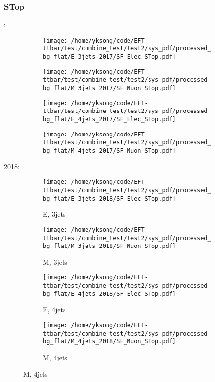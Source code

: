 \documentclass{beamer}
\begin{document}
\begin{frame}
\frametitle{STop}
\fontsize{5}{1}:
\begin{figure}
\centering
\begin{subfigure}[b]{0.24\textwidth}
\texttt{[image: /home/yksong/code/EFT-ttbar/test/combine\_test/test2/sys\_pdf/processed\_bg\_flat/E\_3jets\_2017/SF\_Elec\_STop.pdf]}
\end{subfigure}
\begin{subfigure}[b]{0.24\textwidth}
\texttt{[image: /home/yksong/code/EFT-ttbar/test/combine\_test/test2/sys\_pdf/processed\_bg\_flat/M\_3jets\_2017/SF\_Muon\_STop.pdf]}
\end{subfigure}
\begin{subfigure}[b]{0.24\textwidth}
\texttt{[image: /home/yksong/code/EFT-ttbar/test/combine\_test/test2/sys\_pdf/processed\_bg\_flat/E\_4jets\_2017/SF\_Elec\_STop.pdf]}
\end{subfigure}
\begin{subfigure}[b]{0.24\textwidth}
\texttt{[image: /home/yksong/code/EFT-ttbar/test/combine\_test/test2/sys\_pdf/processed\_bg\_flat/M\_4jets\_2017/SF\_Muon\_STop.pdf]}
\end{subfigure}
\end{figure}
2018:
\begin{figure}
\centering
\begin{subfigure}[b]{0.24\textwidth}
\texttt{[image: /home/yksong/code/EFT-ttbar/test/combine\_test/test2/sys\_pdf/processed\_bg\_flat/E\_3jets\_2018/SF\_Elec\_STop.pdf]}
\captionsetup{font=tiny}
\caption{E, 3jets}
\end{subfigure}
\begin{subfigure}[b]{0.24\textwidth}
\texttt{[image: /home/yksong/code/EFT-ttbar/test/combine\_test/test2/sys\_pdf/processed\_bg\_flat/M\_3jets\_2018/SF\_Muon\_STop.pdf]}
\captionsetup{font=tiny}
\caption{M, 3jets}
\end{subfigure}
\begin{subfigure}[b]{0.24\textwidth}
\texttt{[image: /home/yksong/code/EFT-ttbar/test/combine\_test/test2/sys\_pdf/processed\_bg\_flat/E\_4jets\_2018/SF\_Elec\_STop.pdf]}
\captionsetup{font=tiny}
\caption{E, 4jets}
\end{subfigure}
\begin{subfigure}[b]{0.24\textwidth}
\texttt{[image: /home/yksong/code/EFT-ttbar/test/combine\_test/test2/sys\_pdf/processed\_bg\_flat/M\_4jets\_2018/SF\_Muon\_STop.pdf]}
\captionsetup{font=tiny}
\caption{M, 4jets}
\end{subfigure}
\end{figure}
\end{frame}
\end{document}
